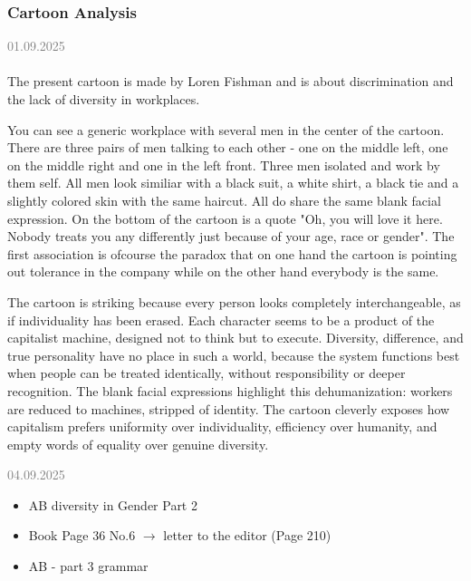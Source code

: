 \documentclass[11pt,a4paper,oneside]{article}
\newcommand{\lessondate}[1]{
	\noindent\hfill\textcolor{gray}{\textsc{#1}} \\
	\vspace{0.5cm}
}
\begin{document}
	\subsubsection{Cartoon Analysis}
	\lessondate{01.09.2025}\\
	The present cartoon is made by Loren Fishman and is about discrimination and the lack of diversity in workplaces. 
	
	You can see a generic workplace with several men in the center of the cartoon. There are three pairs of men talking to each other -  one on the middle left, one on the middle right and one in the left front. Three men isolated and work by them self. All men look similiar with a black suit, a white shirt, a black tie and a slightly colored skin with the same haircut. All do share the same blank facial expression. 
	On the bottom of the cartoon is a quote "Oh, you will love it here. Nobody treats you any differently just because of your age, race or gender". 
	The first association is ofcourse the paradox that on one hand the cartoon is pointing out tolerance in the company while on the other hand everybody is the same. 
	
	
	\vspace{20mm}
	The cartoon is striking because every person looks completely interchangeable, as if individuality has been erased. Each character seems to be a product of the capitalist machine, designed not to think but to execute. Diversity, difference, and true personality have no place in such a world, because the system functions best when people can be treated identically, without responsibility or deeper recognition. The blank facial expressions highlight this dehumanization: workers are reduced to machines, stripped of identity. The cartoon cleverly exposes how capitalism prefers uniformity over individuality, efficiency over humanity, and empty words of equality over genuine diversity.
	
	\newpage
	
	\begin{task}{\lessondate{04.09.2025}}
		\begin{itemize}
			\item AB diversity in Gender Part 2 
			\item Book Page 36 No.6 $\rightarrow$ letter to the editor (Page 210)
			\item AB - part 3 grammar
		\end{itemize}
	\end{task}
	
\end{document}
